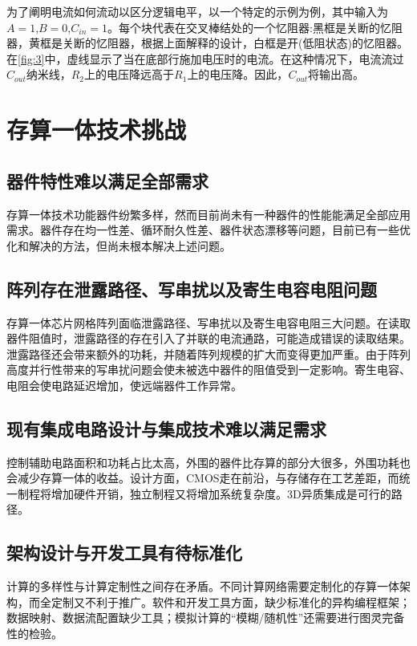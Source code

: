 \documentclass[withoutpreface,bwprint]{cumcmthesis}
\begin{document}
为了阐明电流如何流动以区分逻辑电平，以一个特定的示例为例，其中输入为$A=1$,$B=0$,$C_{in}=1$。每个块代表在交叉棒结处的一个忆阻器:黑框是关断的忆阻器，黄框是关断的忆阻器，根据上面解释的设计，白框是开(低阻状态)的忆阻器。在\cref{fig:3}中，虚线显示了当在底部行施加电压时的电流。在这种情况下，电流流过$C_{out}$纳米线，$R_2$上的电压降远高于$R_1$上的电压降。因此，$C_{out}$将输出高。



\section{存算一体技术挑战}
\subsection{器件特性难以满足全部需求}
存算一体技术功能器件纷繁多样，然而目前尚未有一种器件的性能能满足全部应用需求。器件存在均一性差、循环耐久性差、器件状态漂移等问题，目前已有一些优化和解决的方法，但尚未根本解决上述问题。

\subsection{阵列存在泄露路径、写串扰以及寄生电容电阻问题}

存算一体芯片网格阵列面临泄露路径、写串扰以及寄生电容电阻三大问题。在读取器件阻值时，泄露路径的存在引入了并联的电流通路，可能造成错误的读取结果。泄露路径还会带来额外的功耗，并随着阵列规模的扩大而变得更加严重。由于阵列高度并行性带来的写串扰问题会使未被选中器件的阻值受到一定影响。寄生电容、电阻会使电路延迟增加，使远端器件工作异常。

\subsection{现有集成电路设计与集成技术难以满足需求}

控制辅助电路面积和功耗占比太高，外围的器件比存算的部分大很多，外围功耗也会减少存算一体的收益。设计方面，CMOS走在前沿，与存储存在工艺差距，而统一制程将增加硬件开销，独立制程又将增加系统复杂度。3D异质集成是可行的路径。

\subsection{架构设计与开发工具有待标准化}

计算的多样性与计算定制性之间存在矛盾。不同计算网络需要定制化的存算一体架构，而全定制又不利于推广。软件和开发工具方面，缺少标准化的异构编程框架；数据映射、数据流配置缺少工具；模拟计算的“模糊/随机性”还需要进行图灵完备性的检验。
\end{document}
